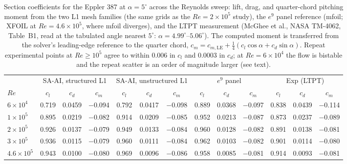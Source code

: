 \documentclass[journal]{new-aiaa}
\begin{document}
\begin{table}[tp]
  \centering
  \small
  \setlength{\tabcolsep}{4.5pt}
  \caption{Section coefficients for the Eppler 387 at $\alpha\!=\!5^\circ$
  across the Reynolds sweep: lift, drag, and quarter-chord pitching moment from
  the two L1 mesh families (the same grids as the $Re\!=\!2\!\times\!10^5$
  study), the $e^9$ panel reference (mfoil; XFOIL at $Re\!=\!4.6\!\times\!10^5$,
  where mfoil diverges), and the LTPT measurement (McGhee et al., NASA TM-4062,
  Table~B1, read at the tabulated angle nearest $5^\circ$:
  $\alpha\!=\!4.99^\circ$--$5.06^\circ$). The computed moment is transferred
  from the solver's leading-edge reference to the quarter chord,
  $c_m\!=\!c_{m,\mathrm{LE}}+\tfrac14(c_l\cos\alpha+c_d\sin\alpha)$. Repeat
  experimental points at $Re\!\geq\!10^5$ agree to within $0.006$ in $c_l$ and
  $0.0003$ in $c_d$; at $Re\!=\!6\!\times\!10^4$ the flow is bistable and the
  repeat scatter is an order of magnitude larger (see text).}
  \label{tab:eppresweep}
  \begin{tabular}{l ccc ccc ccc ccc}
    \toprule
    & \multicolumn{3}{c}{SA-AI, structured L1} & \multicolumn{3}{c}{SA-AI, unstructured L1}
    & \multicolumn{3}{c}{$e^9$ panel} & \multicolumn{3}{c}{Exp (LTPT)}\\
    \cmidrule(lr){2-4}\cmidrule(lr){5-7}\cmidrule(lr){8-10}\cmidrule(lr){11-13}
    $Re$ & $c_l$ & $c_d$ & $c_m$ & $c_l$ & $c_d$ & $c_m$ & $c_l$ & $c_d$ & $c_m$ & $c_l$ & $c_d$ & $c_m$ \\
    \midrule
    $6\!\times\!10^4$   & 0.719 & 0.0459 & $-$0.094 & 0.792 & 0.0417 & $-$0.098 & 0.889 & 0.0368 & $-$0.097 & 0.838 & 0.0439 & $-$0.114 \\
    $1\!\times\!10^5$   & 0.895 & 0.0219 & $-$0.082 & 0.914 & 0.0209 & $-$0.085 & 0.952 & 0.0213 & $-$0.087 & 0.873 & 0.0237 & $-$0.089 \\
    $2\!\times\!10^5$   & 0.926 & 0.0137 & $-$0.079 & 0.949 & 0.0133 & $-$0.084 & 0.960 & 0.0128 & $-$0.082 & 0.891 & 0.0138 & $-$0.081 \\
    $3\!\times\!10^5$   & 0.936 & 0.0115 & $-$0.079 & 0.960 & 0.0111 & $-$0.084 & 0.962 & 0.0103 & $-$0.082 & 0.901 & 0.0114 & $-$0.080 \\
    $4.6\!\times\!10^5$ & 0.943 & 0.0100 & $-$0.080 & 0.969 & 0.0096 & $-$0.086 & 0.958 & 0.0085 & $-$0.081 & 0.914 & 0.0093 & $-$0.081 \\
    \bottomrule
  \end{tabular}
\end{table}
\end{document}
